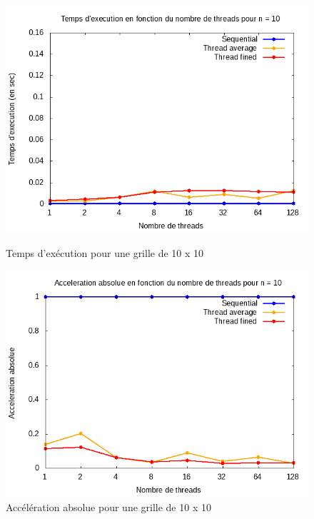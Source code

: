 \documentclass[10pt,a4paper]{article}
\begin{document}
\begin{figure}[h]
  \centering
  \begin{minipage}[b]{0.49\textwidth}
	\includegraphics[width=\textwidth]{./Time/size_10_time.png}
    \caption{Temps d'exécution pour une grille de 10 x 10}
  \end{minipage}
  \hfill
  \begin{minipage}[b]{0.49\textwidth}
    \includegraphics[width=\textwidth]{./Time/size_10_acceleration.png}
    \caption{Accélération absolue pour une grille de 10 x 10}
  \end{minipage}
\end{figure}
\end{document}
